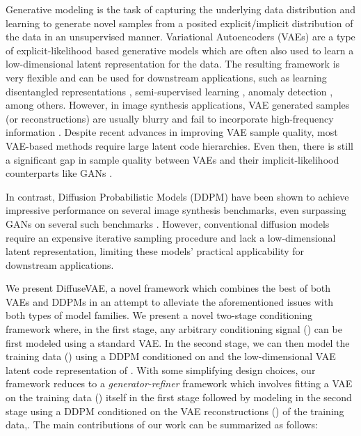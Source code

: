 \documentclass[10pt]{article} \usepackage[accepted]{tmlr}
\begin{document}
Generative modeling is the task of capturing the underlying data distribution and learning to generate novel samples from a posited explicit/implicit distribution of the data in an unsupervised manner. Variational Autoencoders (VAEs) \citep{kingma2014autoencoding, rezende2016variational} are a type of explicit-likelihood based generative models which are often also used to learn a low-dimensional latent representation for the data. The resulting framework is very flexible and can be used for downstream applications, such as learning disentangled representations \citep{Higgins2017betaVAELB, chen2019isolating, burgess2018understanding}, semi-supervised learning \citep{kingma2014semisupervised}, anomaly detection \citep{pol2020anomaly}, among others. However, in image synthesis applications, VAE generated samples (or reconstructions) are usually blurry and fail to incorporate high-frequency information \citep{dosovitskiy2016generating}. Despite recent advances \citep{oord2018neural, razavi2019generating, vahdat2021nvae, child2021deep, xiao2021vaebm} in improving VAE sample quality, most VAE-based methods require large latent code hierarchies. Even then, there is still a significant gap in sample quality between VAEs and their implicit-likelihood counterparts like GANs \citep{goodfellow2014generative, karras2018progressive, karras2019stylebased, karras2020analyzing}.

\par In contrast, Diffusion Probabilistic Models (DDPM) \citep{sohldickstein2015deep, ho2020denoising} have been shown to achieve impressive performance on several image synthesis benchmarks, even surpassing GANs on several such benchmarks \citep{dhariwal2021diffusion, ho2021cascaded}. However, conventional diffusion models require an expensive iterative sampling procedure and lack a low-dimensional latent representation, limiting these models' practical applicability for downstream applications.

\par
We present DiffuseVAE, a novel framework which combines the best of both VAEs and DDPMs in an attempt to alleviate the aforementioned issues with both types of model families. We present a novel two-stage conditioning framework where, in the first stage, any arbitrary conditioning signal () can be first modeled using a standard VAE. In the second stage, we can then model the training data () using a DDPM conditioned on  and the low-dimensional VAE latent code representation of . With some simplifying design choices, our framework reduces to a \textit{generator-refiner} framework which involves fitting a VAE on the training data () itself in the first stage followed by modeling  in the second stage using a DDPM conditioned on the VAE reconstructions () of the training data,. The main contributions of our work can be summarized as follows:
\end{document}

